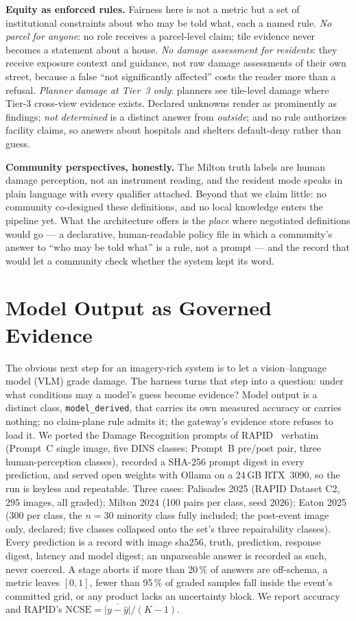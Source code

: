 \documentclass[sigconf,screen]{acmart}
\begin{document}
\textbf{Equity as enforced rules.} Fairness here is not a metric but a set
of institutional constraints about who may be told what, each a named
rule. \emph{No parcel for anyone}: no role receives a parcel-level claim;
tile evidence never becomes a statement about a house. \emph{No damage
assessment for residents}: they receive exposure context and guidance,
not raw damage assessments of their own street, because a false ``not
significantly affected'' costs the reader more than a refusal.
\emph{Planner damage at Tier~3 only}: planners see tile-level damage where
Tier-3 cross-view evidence exists. Declared unknowns
render as prominently as findings; \emph{not determined} is a distinct
answer from \emph{outside}; and no rule authorizes facility claims, so
answers about hospitals and shelters default-deny rather than guess.

\textbf{Community perspectives, honestly.} The Milton truth labels are
human damage perception, not an instrument reading, and the resident mode
speaks in plain language with every qualifier attached. Beyond that we
claim little: no community co-designed these definitions, and no local
knowledge enters the pipeline yet. What the architecture offers is the
\emph{place} where negotiated definitions would go --- a declarative,
human-readable policy file in which a community's answer to ``who may be
told what'' is a rule, not a prompt --- and the record that would let a
community check whether the system kept its word.

\section{Model Output as Governed Evidence}
\label{sec:vlm}

The obvious next step for an imagery-rich system is to let a
vision--language model (VLM) grade damage. The harness turns that step
into a question: under what conditions may a model's guess become
evidence? Model output is a distinct class, \texttt{model\_derived}, that
carries its own measured accuracy or carries nothing; no claim-plane rule
admits it; the gateway's evidence store refuses to load it. We ported the
Damage Recognition prompts of RAPID~\cite{yang2026rapid} verbatim (Prompt~C
single image, five DINS classes; Prompt~B pre/post pair, three
human-perception classes), recorded a SHA-256 prompt digest in every
prediction, and served open weights with Ollama on a 24\,GB RTX~3090, so
the run is keyless and repeatable. Three cases: Palisades 2025 (RAPID
Dataset C2, 295 images, all graded); Milton 2024 (100 pairs per class,
seed 2026); Eaton 2025 (300 per class, the $n{=}30$ minority class fully
included; the post-event image only, declared; five classes collapsed
onto the set's three repairability classes). Every prediction is a record
with image sha256, truth, prediction, response digest, latency and model
digest; an unparseable answer is recorded as such, never coerced. A stage
aborts if more than 20\,\% of answers are off-schema, a metric leaves
$[0,1]$, fewer than 95\,\% of graded samples fall inside the event's
committed grid, or any product lacks an uncertainty block. We report
accuracy and RAPID's $\mathrm{NCSE}=\overline{|y-\hat{y}|}/(K{-}1)$.
\end{document}
